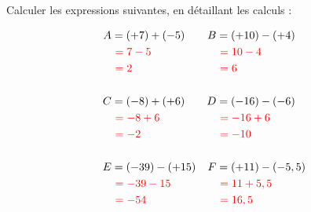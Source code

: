 \documentclass[Controlev2-correction]{subfiles}
\begin{document}
\maketitle

\begin{exercice}[(3 points)] Calculer les expressions suivantes, en détaillant les calculs :

	\begin{align*}
		A & = (+7) + (-5)             & B & = (+10) - (+4)            \\
		  & \ \correction{= 7 - 5}    &   & \  \correction{= 10 - 4}  \\
		  & \  \correction{= 2}       &   & \  \correction{= 6}       \\
		\\
		C & = (-8) + (+6)             & D & =  (-16) - (-6)           \\
		  & \ \correction{= -8 + 6}   &   & \ \correction{= -16 + 6}  \\
		  & \ \correction{= -2}       &   & \ \correction{= -10}      \\
		\\
		E & = (-39) - (+15)           & F & =   (+11) - (-5,5)        \\
		  & \ \correction{= -39 - 15} &   & \ \correction{= 11 + 5,5} \\
		  & \ \correction{= -54}      &   & \ \correction{= 16,5}     \\
	\end{align*}
\end{exercice}
\end{document}
